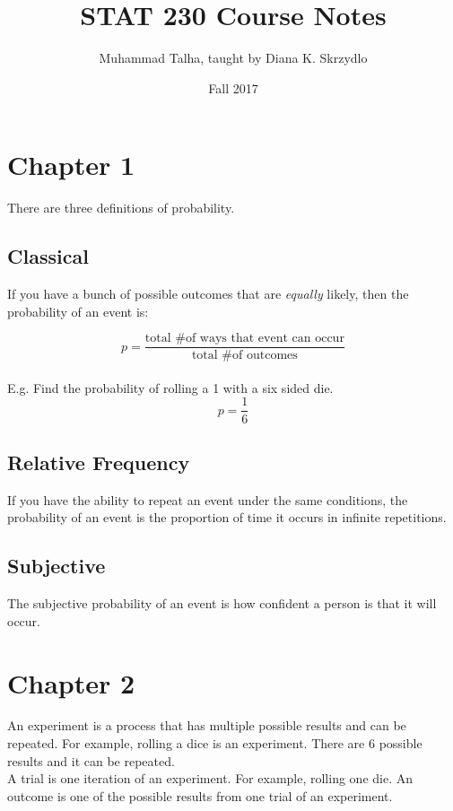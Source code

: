 \documentclass[12pt, letterpaper]{article}
\begin{document}
\title{STAT 230 Course Notes}
\author{Muhammad Talha, taught by Diana K. Skrzydlo }
\date{Fall 2017}

\maketitle

\section{Chapter 1}
There are three definitions of probability.

\subsection{Classical}
If you have a bunch of possible outcomes that are \emph{equally} likely, then the probability
of an event is:

\[
 p = \frac{\text{total \# of ways that event can occur}}{\text{total \# of outcomes}}
\] \\

E.g. Find the probability of rolling a 1 with a six sided die. 
\[
p = \frac{1}{6}
\]

\subsection{Relative Frequency}
If you have the ability to repeat an event under the same conditions, the probability of an
event is the proportion of time it occurs in infinite repetitions.

\subsection{Subjective}
The subjective probability of an event is how confident a person is that it will occur.

\newpage

\section{Chapter 2}
An experiment is a process that has multiple possible results and can be repeated.
For example, rolling a dice is an experiment. There are 6 possible results and it can be repeated.\\

A trial is one iteration of an experiment. For example, rolling one die.
An outcome is one of the possible results from one trial of an experiment.\\
\end{document}
